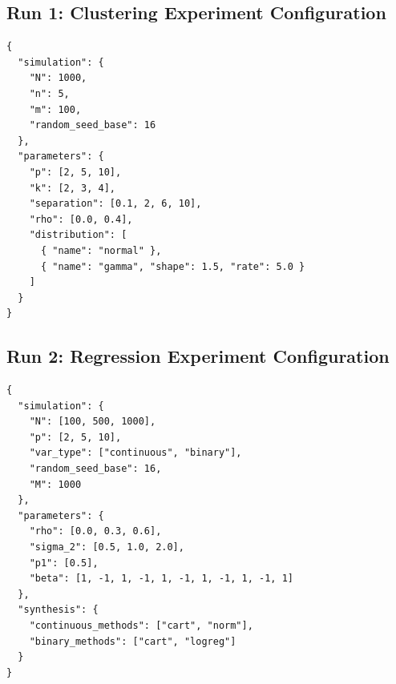 \subsection{Run 1: Clustering Experiment Configuration}
\begin{verbatim}
{
  "simulation": {
    "N": 1000,
    "n": 5,
    "m": 100,
    "random_seed_base": 16
  },
  "parameters": {
    "p": [2, 5, 10],
    "k": [2, 3, 4],
    "separation": [0.1, 2, 6, 10],
    "rho": [0.0, 0.4],
    "distribution": [
      { "name": "normal" },
      { "name": "gamma", "shape": 1.5, "rate": 5.0 }
    ]
  }
}
\end{verbatim}

\subsection{Run 2: Regression Experiment Configuration}
\begin{verbatim}
{
  "simulation": {
    "N": [100, 500, 1000],
    "p": [2, 5, 10],
    "var_type": ["continuous", "binary"],
    "random_seed_base": 16,
    "M": 1000
  },
  "parameters": {
    "rho": [0.0, 0.3, 0.6],
    "sigma_2": [0.5, 1.0, 2.0],
    "p1": [0.5],
    "beta": [1, -1, 1, -1, 1, -1, 1, -1, 1, -1, 1]
  },
  "synthesis": {
    "continuous_methods": ["cart", "norm"],
    "binary_methods": ["cart", "logreg"]
  }
}
\end{verbatim}
